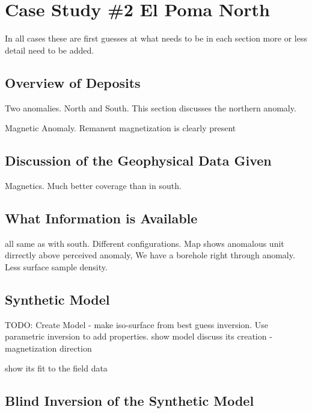 
\chapter{Case Study \#2 El Poma North}
\label{ch:CaseStudy1}

In all cases these are first guesses at what needs to be in each section more or less detail need to be added.



\section{Overview of Deposits}
\label{sec:Overview of Deposits:ElPoma2}

Two anomalies. North and South. This section discusses the northern anomaly.

Magnetic Anomaly. Remanent magnetization is clearly present

\section{Discussion of the Geophysical Data Given}
\label{sec:Discussion of the Geophysical Data Given:ElPoma2}

Magnetics. Much better coverage than in south.
 
\section{What Information is Available}
\label{sec:What Information is Available:ElPoma2}

all same as with south. Different configurations. Map shows anomalous unit dirrectly above perceived anomaly, We have a borehole right through anomaly. Less surface sample density.

\section{Synthetic Model}
\label{sec:Synthetic Model:ElPoma2}

TODO: Create Model
- make iso-surface from best guess inversion. Use parametric inversion to add properties.
show model
discuss its creation
- magnetization direction

show its fit to the field data

\section{Blind Inversion of the Synthetic Model}
\label{sec:Blind Inversion of the Synthetic Model:ElPoma2}


